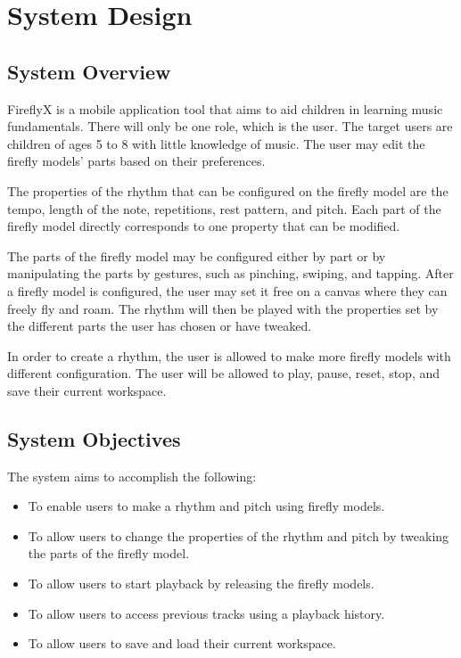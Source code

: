 %
%
%                 

\chapter{System Design}

\section{System Overview}
FireflyX is a mobile application tool that aims to aid children in learning music fundamentals. There will only be one role, which is the user. The target users are children of ages 5 to 8 with little knowledge of music. The user may edit the firefly models' parts based on their preferences.

The properties of the rhythm that can be configured on the firefly model are the tempo, length of the note, repetitions, rest pattern, and pitch. Each part of the firefly model directly corresponds to one property that can be modified.

The parts of the firefly model may be configured either by part or by manipulating the parts by gestures, such as pinching, swiping, and tapping. After a firefly model is configured, the user may set it free on a canvas where they can freely fly and roam. The rhythm will then be played with the properties set by the different parts the user has chosen or have tweaked. 

In order to create a rhythm, the user is allowed to make more firefly models with different configuration. The user will be allowed to play, pause, reset, stop, and save their current workspace.

\section{System Objectives}
The system aims to accomplish the following:
\begin{itemize}
    \item To enable users to make a rhythm and pitch using firefly models.
    \item To allow users to change the properties of the rhythm and pitch by tweaking the parts of the firefly model.
    \item To allow users to start playback by releasing the firefly models.
    \item To allow users to access previous tracks using a playback history.
    \item To allow users to save and load their current workspace.
\end{itemize}
